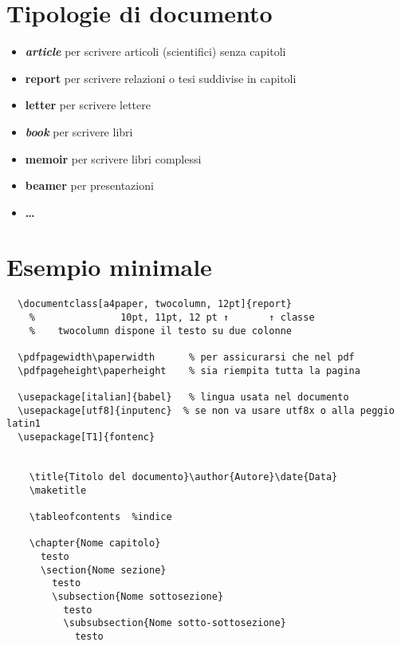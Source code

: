 \section{Tipologie di documento}
\begin{itemize}
  \item \textbf{\emph{article}} per scrivere articoli (scientifici) senza capitoli
  \item \textbf{report} per scrivere relazioni o tesi suddivise in capitoli
  \item \textbf{letter} per scrivere lettere
  \item \textbf{\emph{book}} per scrivere libri
  \item {\footnotesize\textbf{memoir} per scrivere libri complessi}
  \item {\footnotesize\textbf{beamer} per presentazioni}
  \item \textbf{\dots}
\end{itemize}

\section{Esempio minimale}
\begin{verbatim}
  \documentclass[a4paper, twocolumn, 12pt]{report}
    %               10pt, 11pt, 12 pt ↑       ↑ classe
    %    twocolumn dispone il testo su due colonne

  \pdfpagewidth\paperwidth      % per assicurarsi che nel pdf
  \pdfpageheight\paperheight    % sia riempita tutta la pagina

  \usepackage[italian]{babel}   % lingua usata nel documento
  \usepackage[utf8]{inputenc}  % se non va usare utf8x o alla peggio latin1
  \usepackage[T1]{fontenc}

  
    \title{Titolo del documento}\author{Autore}\date{Data}
    \maketitle

    \tableofcontents  %indice

    \chapter{Nome capitolo}
      testo
      \section{Nome sezione}
        testo
        \subsection{Nome sottosezione}
          testo
          \subsubsection{Nome sotto-sottosezione}
            testo

  
  \end{verbatim}

